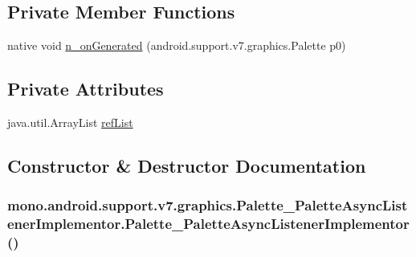 \subsection*{Private Member Functions}
\begin{CompactItemize}
\item 
native void \hyperlink{classmono_1_1android_1_1support_1_1v7_1_1graphics_1_1_palette___palette_async_listener_implementor_72c3b42df2bd4d73094526bc6d05d191}{n\_\-onGenerated} (android.support.v7.graphics.Palette p0)
\end{CompactItemize}
\subsection*{Private Attributes}
\begin{CompactItemize}
\item 
java.util.ArrayList \hyperlink{classmono_1_1android_1_1support_1_1v7_1_1graphics_1_1_palette___palette_async_listener_implementor_a48f038c073bd65682d81ca5089716b0}{refList}
\end{CompactItemize}


\subsection{Constructor \& Destructor Documentation}
\hypertarget{classmono_1_1android_1_1support_1_1v7_1_1graphics_1_1_palette___palette_async_listener_implementor_f78f10665c82470b7b63e6e76b37baef}{
\subsubsection[{Palette\_\-PaletteAsyncListenerImplementor}]{\setlength{\rightskip}{0pt plus 5cm}mono.android.support.v7.graphics.Palette\_\-PaletteAsyncListenerImplementor.Palette\_\-PaletteAsyncListenerImplementor ()}}
\label{classmono_1_1android_1_1support_1_1v7_1_1graphics_1_1_palette___palette_async_listener_implementor_f78f10665c82470b7b63e6e76b37baef}




